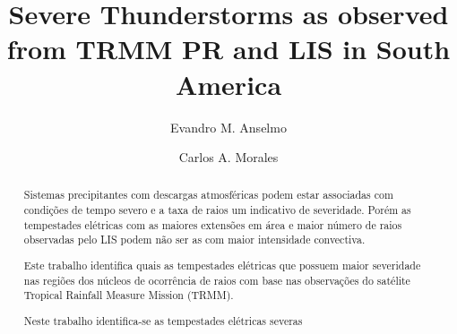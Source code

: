 \documentclass[preprint,authoryear,3p]{elsarticle}
\begin{document}
\begin{frontmatter}
\title{Severe Thunderstorms as observed from TRMM PR and LIS in South America}
\author[usp]{Evandro M. Anselmo}

\author[usp]{Carlos A. Morales}

\address[usp]{ Institute of Astronomy, Geophysics and Atmospheric Science of USP, São Paulo-SP, 12227-010, Brazil }


\begin{abstract}
Sistemas precipitantes com descargas atmosféricas podem estar associadas com condições de tempo severo e a taxa de raios um indicativo de severidade. Porém as tempestades elétricas com as maiores extensões em área e maior número de raios observadas pelo LIS podem não ser as com maior intensidade convectiva. 


Este trabalho identifica quais as tempestades elétricas que possuem maior severidade nas regiões dos núcleos de ocorrência de raios com base nas observações do satélite Tropical Rainfall Measure Mission (TRMM). 

Neste trabalho identifica-se as tempestades elétricas severas 



\end{abstract}
\end{frontmatter}
\end{document}
